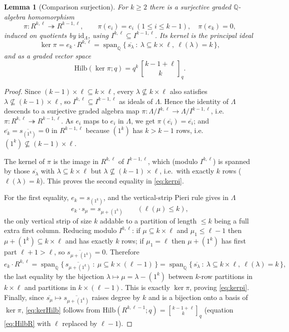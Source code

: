 \documentclass{amsart}
\newtheorem{lemma}{Lemma}
\theoremstyle{definition}
\newcommand{\Hilb}{\mathrm{Hilb}}
\newcommand{\qbin}[2]{\genfrac{[}{]}{0pt}{}{#1}{#2}_q}
\newcommand{\Q}{\mathbb{Q}}
\newcommand{\rkl}{R^{k,\ell}}
\begin{document}
\begin{lemma}[Comparison surjection]\label{lem:pi}
For $k\ge2$ there is a surjective graded $\Q$-algebra homomorphism
\[
\pi\colon \rkl\twoheadrightarrow R^{k-1,\ell},\qquad \pi(e_i)=e_i\ (1\le i\le k-1),
\quad \pi(e_k)=0,
\]
induced on quotients by $\mathrm{id}_\Lambda$, using $I^{k,\ell}\subseteq I^{k-1,\ell}$.
Its kernel is the principal ideal
\begin{equation}\label{eq:kerpi}
\ker\pi=e_k\cdot\rkl
=\operatorname{span}_{\Q}\{\,\overline{s_\lambda}\ :\ \lambda\subseteq k\times\ell,\ \ell(\lambda)=k\,\},
\end{equation}
and as a graded vector space
\begin{equation}\label{eq:kerHilb}
\Hilb(\ker\pi;q)=q^{k}\,\qbin{k-1+\ell}{k}.
\end{equation}
\end{lemma}

\begin{proof}
Since $(k-1)\times\ell\subseteq k\times\ell$, every $\lambda\not\subseteq k\times\ell$
also satisfies $\lambda\not\subseteq(k-1)\times\ell$, so $I^{k,\ell}\subseteq
I^{k-1,\ell}$ as ideals of $\Lambda$. Hence the identity of $\Lambda$ descends to a
surjective graded algebra map $\pi\colon\Lambda/I^{k,\ell}\to\Lambda/I^{k-1,\ell}$,
i.e.\ $\pi\colon\rkl\twoheadrightarrow R^{k-1,\ell}$. As $e_i$ maps to $e_i$ in
$\Lambda$, we get $\pi(\overline{e_i})=\overline{e_i}$; and
$\overline{e_k}=\overline{s_{(1^k)}}=0$ in $R^{k-1,\ell}$ because $(1^k)$ has $k>k-1$
rows, i.e.\ $(1^k)\not\subseteq(k-1)\times\ell$.

The kernel of $\pi$ is the image in $\rkl$ of $I^{k-1,\ell}$, which (modulo
$I^{k,\ell}$) is spanned by those $\overline{s_\lambda}$ with $\lambda\subseteq
k\times\ell$ but $\lambda\not\subseteq(k-1)\times\ell$, i.e.\ with exactly $k$ rows
($\ell(\lambda)=k$). This proves the second equality in \eqref{eq:kerpi}.

For the first equality, $e_k=s_{(1^k)}$, and the vertical-strip Pieri rule gives in
$\Lambda$
\[
e_k\cdot s_\mu=s_{\mu+(1^k)}\qquad(\ell(\mu)\le k),
\]
the only vertical strip of size $k$ addable to a partition of length $\le k$ being a
full extra first column. Reducing modulo $I^{k,\ell}$: if $\mu\subseteq k\times\ell$
and $\mu_1\le\ell-1$ then $\mu+(1^k)\subseteq k\times\ell$ and has exactly $k$ rows;
if $\mu_1=\ell$ then $\mu+(1^k)$ has first part $\ell+1>\ell$, so
$\overline{s_{\mu+(1^k)}}=0$. Therefore
\[
e_k\cdot\rkl=\operatorname{span}_{\Q}
\{\,\overline{s_{\mu+(1^k)}}\ :\ \mu\subseteq k\times(\ell-1)\,\}
=\operatorname{span}_{\Q}\{\,\overline{s_\lambda}\ :\ \lambda\subseteq k\times\ell,\ \ell(\lambda)=k\,\},
\]
the last equality by the bijection $\lambda\mapsto\mu=\lambda-(1^k)$ between
$k$-row partitions in $k\times\ell$ and partitions in $k\times(\ell-1)$. This is
exactly $\ker\pi$, proving \eqref{eq:kerpi}. Finally, since $\overline{s_{\mu}}\mapsto
\overline{s_{\mu+(1^k)}}$ raises degree by $k$ and is a bijection onto a basis of
$\ker\pi$, \eqref{eq:kerHilb} follows from $\Hilb(R^{k,\ell-1};q)=\qbin{k-1+\ell}{k}$
(equation \eqref{eq:HilbR} with $\ell$ replaced by $\ell-1$).
\end{proof}
\end{document}
